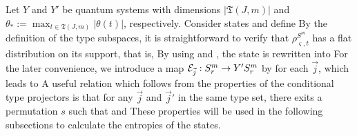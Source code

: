\documentclass[journal]{IEEEtran}
\begin{document}
\begin{lmm}
\begin{lmm}
Let $Y$ and $Y'$ be quantum systems with dimensions $|\mathfrak{T}(J,m)|$ and $\theta_*:=\max_{t\in\mathfrak{T}(J,m)}|\theta(t)|$, respectively.
Consider states
and define
By the definition of the type subspaces, it is straightforward to verify that $\rho_{\varsigma,t}^{S^m}$ has a flat distribution on its support, that is,
By using  and , the state  is rewritten into
For the later convenience, we introduce a map ${\mathcal E}_{\vec{j}}:S_r^m\rightarrow Y'S_r^m$ by 
for each $\vec{j}$, which leads to
A useful relation which follows from the properties of the conditional type projectors is that for any $\vec{j}$ and $\vec{j}'$ in the same type set, there exits a permutation $s$ such that
and
These properties will be used in the following subsections to calculate the entropies of the states.



\end{lmm}
\end{lmm}
\end{document}
